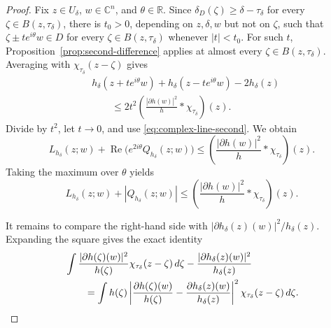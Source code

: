\documentclass[10pt,a4paper]{amsart}
\newcommand{\C}{\mathbb C}
\begin{document}
\begin{proof}
Fix $z\in U_\delta$, $w\in\C^n$, and $\theta\in\mathbb R$. Since
$\delta_D(\zeta)\ge\delta-\tau_\delta$ for every
$\zeta\in B(z,\tau_\delta)$, there is $t_0>0$, depending on
$z,\delta,w$ but not on $\zeta$, such that
$\zeta\pm te^{i\theta}w\in D$ for every
$\zeta\in B(z,\tau_\delta)$ whenever $|t|<t_0$. For such $t$,
Proposition~\ref{prop:second-difference} applies at almost every
$\zeta\in B(z,\tau_\delta)$. Averaging with
$\chi_{\tau_\delta}(z-\zeta)$ gives
\begin{align*}
 &h_\delta(z+t e^{i\theta}w)+h_\delta(z-t e^{i\theta}w)-2h_\delta(z)\\
 &\qquad\le
 2t^2\left(\frac{|\partial h(w)|^2}{h}*\chi_{\tau_\delta}\right)(z).
\end{align*}
Divide by $t^2$, let $t\to0$, and use
\eqref{eq:complex-line-second}. We obtain
\[
 L_{h_\delta}(z;w)+\operatorname{Re}\bigl(e^{2i\theta}Q_{h_\delta}(z;w)\bigr)
 \le\left(\frac{|\partial h(w)|^2}{h}*\chi_{\tau_\delta}\right)(z).
\]
Taking the maximum over $\theta$ yields
\begin{equation}\label{eq:convineq}
 L_{h_\delta}(z;w)+|Q_{h_\delta}(z;w)|
 \le\left(\frac{|\partial h(w)|^2}{h}*\chi_{\tau_\delta}\right)(z).
\end{equation}

It remains to compare the right-hand side with
$|\partial h_\delta(z)(w)|^2/h_\delta(z)$. Expanding the square gives the
exact identity
\begin{align}\label{eq:variance-identity}
 &\int
 \frac{|\partial h(\zeta)(w)|^2}{h(\zeta)}
 \chi_{\tau_\delta}(z-\zeta)\,d\zeta
 -\frac{|\partial h_\delta(z)(w)|^2}{h_\delta(z)}\notag\\
 &\qquad=
 \int h(\zeta)
 \left|
 \frac{\partial h(\zeta)(w)}{h(\zeta)}
 -\frac{\partial h_\delta(z)(w)}{h_\delta(z)}
 \right|^2
 \chi_{\tau_\delta}(z-\zeta)\,d\zeta.
\end{align}


\end{proof}
\end{document}
